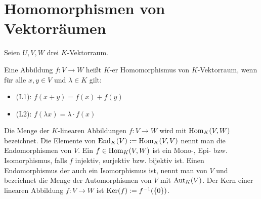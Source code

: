\section{Homomorphismen von Vektorräumen}

Seien $U,V,W$ drei $K$-Vektorraum. \\

\begin{definition}[linear]
	Eine Abbildung $f: V \to W$ heißt $K$-er Homomorphismus von $K$-Vektorraum, wenn für 
	alle $x,y\in V$ und $\lambda\in K$ gilt:
	\begin{itemize}
		\item (L1): $f(x+y)=f(x)+f(y)$
		\item (L2): $f(\lambda x)=\lambda \cdot f(x)$
	\end{itemize}
	Die Menge der $K$-linearen Abbildungen $f: V\to W$ wird mit $\operatorname{Hom}_K(V,W)$ bezeichnet. Die Elemente von $\operatorname{End}_K(V)
	:= \operatorname{Hom}_K(V,V)$ nennt man die Endomorphismen von $V$. Ein $f\in \operatorname{Hom}_K(V,W)$ ist ein Mono-, Epi- bzw. Isomorphismus, 
	falls $f$ injektiv, surjektiv bzw. bijektiv ist. Einen Endomorphismus der auch ein Isomorphismus ist, nennt man 
	 von $V$ und bezeichnet die Menge der Automorphismen von $V$ mit $\operatorname{Aut}_K(V)$. Der Kern einer linearen 
	Abbildung $f: V\to W$ ist $\operatorname{Ker}(f):= f^{-1}(\{0\})$.
\end{definition}